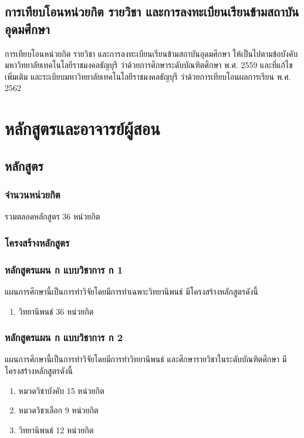 \subsection{การเทียบโอนหน่วยกิต รายวิชา และการลงทะเบียนเรียนข้ามสถาบันอุดมศึกษา}
การเทียบโอนหน่วยกิต รายวิชา และการลงทะเบียนเรียนข้ามสถาบันอุดมศึกษา ให้เป็นไปตามข้อบังคับมหาวิทยาลัยเทคโนโลยีราชมงคลธัญบุรี ว่าด้วยการศึกษาระดับบัณฑิตศึกษา พ.ศ. 2559 และที่แก้ไขเพิ่มเติม และระเบียบมหาวิทยาลัยเทคโนโลยีราชมงคลธัญบุรี ว่าด้วยการเทียบโอนผลการเรียน พ.ศ. 2562

\section{หลักสูตรและอาจารย์ผู้สอน}
\subsection{หลักสูตร}

\subsubsection{จำนวนหน่วยกิต}	
รวมตลอดหลักสูตร 36 หน่วยกิต

\subsubsection{โครงสร้างหลักสูตร}
 
\subsubsection*{หลักสูตรแผน ก แบบวิชาการ ก 1} 
แผนการศึกษานี้เป็นการทำวิจัยโดยมีการทำเฉพาะวิทยานิพนธ์ มีโครงสร้างหลักสูตรดังนี้

\begin{enumerate}
	\item วิทยานิพนธ์ \hfill 36 หน่วยกิต
\end{enumerate}

\subsubsection*{หลักสูตรแผน ก แบบวิชาการ ก 2} 
แผนการศึกษานี้เป็นการทำวิจัยโดยมีการทำวิทยานิพนธ์ และศึกษารายวิชาในระดับบัณฑิตศึกษา มีโครงสร้างหลักสูตรดังนี้

\begin{enumerate}
	\item หมวดวิชาบังคับ \hfill 15 หน่วยกิต
	\item หมวดวิชาเลือก \hfill 9 หน่วยกิต
	\item วิทยานิพนธ์ \hfill 12 หน่วยกิต
\end{enumerate}



